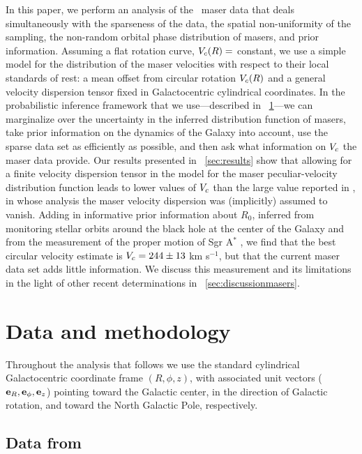 In this paper, we perform an analysis of the \reid\ maser data that
deals simultaneously with the sparseness of the data, the spatial
non-uniformity of the sampling, the non-random orbital phase
distribution of masers, and prior information. Assuming a flat
rotation curve, $V_c(R) = $ constant, we use a simple model for the
distribution of the maser velocities with respect to their local
standards of rest: a mean offset from circular rotation $V_c(R)$ and a
general velocity dispersion tensor fixed in Galactocentric cylindrical
coordinates. In the probabilistic inference framework that we
use---described in \sectionname~\ref{sec:data}---we can marginalize
over the uncertainty in the inferred distribution function of masers,
take prior information on the dynamics of the Galaxy into account, use
the sparse data set as efficiently as possible, and then ask what
information on $V_c$ the maser data provide. Our results presented in
\sectionname~\ref{sec:results} show that allowing for a finite
velocity dispersion tensor in the model for the maser
peculiar-velocity distribution function leads to lower values of $V_c$
than the large value reported in \reid, in whose analysis the maser
velocity dispersion was (implicitly) assumed to vanish.  Adding in
informative prior information about $R_0$, inferred from monitoring
stellar orbits around the black hole at the center of the Galaxy
\citep{Ghez08a,Gillessen09a} and from the measurement of the proper
motion of Sgr A$^*$ \citep{Reid04a}, we find that the best circular
velocity estimate is $V_c = 244 \pm 13$ km s$^{-1}$, but that the
current maser data set adds little information. We discuss this
measurement and its limitations in the light of other recent
determinations in \sectionname~\ref{sec:discussionmasers}.


\section{Data and methodology}\label{sec:data}

Throughout the analysis that follows we use the standard cylindrical
Galactocentric coordinate frame $(R,\phi,z)$, with associated unit
vectors ($\mathbf{e}_{R},\mathbf{e}_{\phi},\mathbf{e}_{z}$) pointing toward the Galactic
center, in the direction of Galactic rotation, and toward the North
Galactic Pole, respectively.

\subsection{Data from \protect\citet{Reid09a}}\label{sec:datasub}

